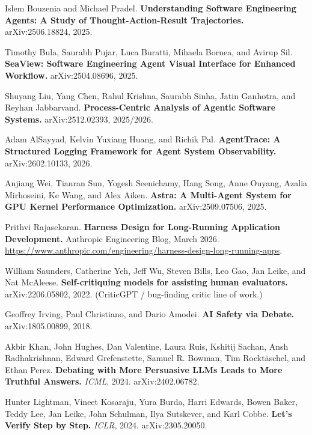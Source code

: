 \documentclass[11pt]{article}
\begin{document}
\begin{enumerate}[leftmargin=2em,itemsep=3pt,label={[\arabic*]}]
  \item Islem Bouzenia and Michael Pradel. \textbf{Understanding Software Engineering Agents: A Study of Thought-Action-Result Trajectories.} arXiv:2506.18824, 2025.

  \item Timothy Bula, Saurabh Pujar, Luca Buratti, Mihaela Bornea, and Avirup Sil. \textbf{SeaView: Software Engineering Agent Visual Interface for Enhanced Workflow.} arXiv:2504.08696, 2025.

  \item Shuyang Liu, Yang Chen, Rahul Krishna, Saurabh Sinha, Jatin Ganhotra, and Reyhan Jabbarvand. \textbf{Process-Centric Analysis of Agentic Software Systems.} arXiv:2512.02393, 2025/2026.

  \item Adam AlSayyad, Kelvin Yuxiang Huang, and Richik Pal. \textbf{AgentTrace: A Structured Logging Framework for Agent System Observability.} arXiv:2602.10133, 2026.

  \item Anjiang Wei, Tianran Sun, Yogesh Seenichamy, Hang Song, Anne Ouyang, Azalia Mirhoseini, Ke Wang, and Alex Aiken. \textbf{Astra: A Multi-Agent System for GPU Kernel Performance Optimization.} arXiv:2509.07506, 2025.

  \item Prithvi Rajasekaran. \textbf{Harness Design for Long-Running Application Development.} Anthropic Engineering Blog, March 2026. \url{https://www.anthropic.com/engineering/harness-design-long-running-apps}.

  \item William Saunders, Catherine Yeh, Jeff Wu, Steven Bills, Leo Gao, Jan Leike, and Nat McAleese. \textbf{Self-critiquing models for assisting human evaluators.} arXiv:2206.05802, 2022. (CriticGPT / bug-finding critic line of work.)

  \item Geoffrey Irving, Paul Christiano, and Dario Amodei. \textbf{AI Safety via Debate.} arXiv:1805.00899, 2018.

  \item Akbir Khan, John Hughes, Dan Valentine, Laura Ruis, Kshitij Sachan, Ansh Radhakrishnan, Edward Grefenstette, Samuel R. Bowman, Tim Rockt\"{a}schel, and Ethan Perez. \textbf{Debating with More Persuasive LLMs Leads to More Truthful Answers.} \emph{ICML}, 2024. arXiv:2402.06782.

  \item Hunter Lightman, Vineet Kosaraju, Yura Burda, Harri Edwards, Bowen Baker, Teddy Lee, Jan Leike, John Schulman, Ilya Sutskever, and Karl Cobbe. \textbf{Let's Verify Step by Step.} \emph{ICLR}, 2024. arXiv:2305.20050.


\end{enumerate}
\end{document}

